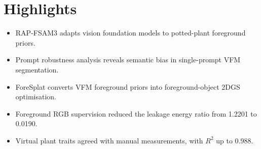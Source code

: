 \documentclass[a4paper,12pt]{article}
\begin{document}
\section*{Highlights}

\begin{itemize}
\item RAP-FSAM3 adapts vision foundation models to potted-plant foreground priors.
\item Prompt robustness analysis reveals semantic bias in single-prompt VFM segmentation.
\item ForeSplat converts VFM foreground priors into foreground-object 2DGS optimisation.
\item Foreground RGB supervision reduced the leakage energy ratio from 1.2201 to 0.0190.
\item Virtual plant traits agreed with manual measurements, with \(R^2\) up to 0.988.
\end{itemize}
\end{document}
